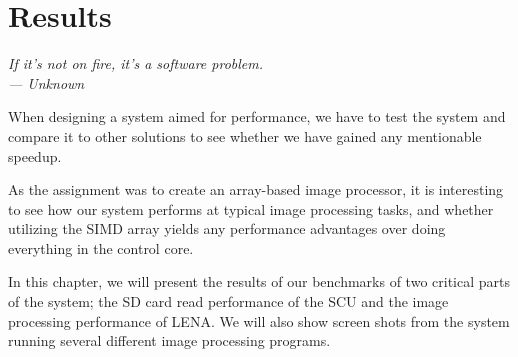 \chapter{Results}\label{ch:res}

\begin{flushright}{\slshape
    If it's not on fire, it's a software problem.\\ \medskip
    --- Unknown}
\end{flushright}

When designing a system aimed for performance, we have to test the system and
compare it to other solutions to see whether we have gained any mentionable
speedup.

As the assignment was to create an array-based
image processor, it is interesting to see how our system performs
at typical image processing tasks, and whether utilizing the \ac{SIMD}
array yields any performance advantages over doing everything in the
control core.


In this chapter, we will present the results of our benchmarks of two
critical parts of the system; the SD card read performance of the
\ac{SCU} and the image processing performance of LENA. We will also show
screen shots from the system running several different image processing
programs.





